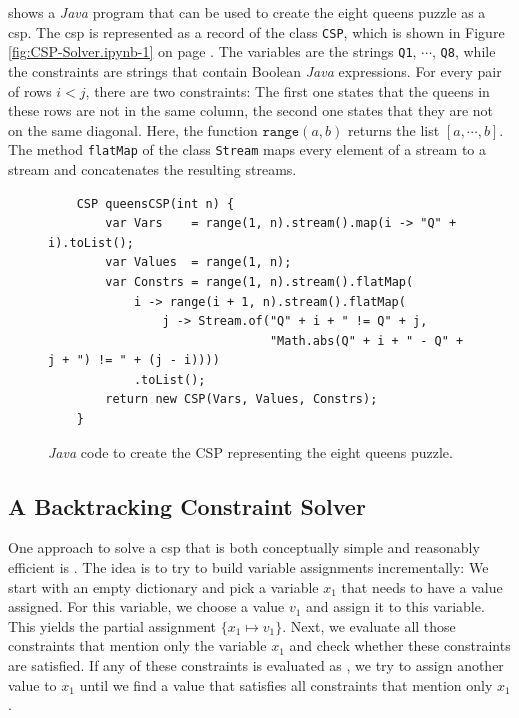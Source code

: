  shows a \textsl{Java} program that can be used to create the eight queens puzzle as a
\Gls{csp}.  The \Gls{csp} is represented as a record of the class \texttt{CSP}, which is shown in Figure
\ref{fig:CSP-Solver.ipynb-1} on page \pageref{fig:CSP-Solver.ipynb-1}.  The variables are the strings
\texttt{Q1}, $\cdots$, \texttt{Q8}, while the constraints are strings
that contain Boolean \textsl{Java} expressions.  For every pair of rows $i < j$, there are two constraints:  The
first one states that the queens in these rows are not in the same column, the second one states that they are not
on the same diagonal.  Here, the function $\texttt{range}(a, b)$ returns the list $[a, \cdots, b]$.  The method
\texttt{flatMap} of the class \texttt{Stream} maps every element of a stream to a stream and concatenates the
resulting streams.

\begin{figure}[!ht]
\centering
\begin{verbatim}
    CSP queensCSP(int n) {
        var Vars    = range(1, n).stream().map(i -> "Q" + i).toList();
        var Values  = range(1, n);
        var Constrs = range(1, n).stream().flatMap(
            i -> range(i + 1, n).stream().flatMap(
                j -> Stream.of("Q" + i + " != Q" + j,
                               "Math.abs(Q" + i + " - Q" + j + ") != " + (j - i))))
            .toList();
        return new CSP(Vars, Values, Constrs);
    }
\end{verbatim}
\vspace*{-0.3cm}
\caption{\textsl{Java} code to create the CSP representing the eight queens puzzle.}
\label{fig:queens-csp.stlx}
\end{figure}


\subsection{A Backtracking Constraint Solver}
One approach to solve a \Gls{csp} that is both conceptually simple and reasonably efficient is
.  The idea is to try to build variable assignments incrementally:  We start with
an empty dictionary and pick a variable $x_1$ that needs to have a value assigned.  For this variable, we
choose a value $v_1$ and assign it to this variable.  This yields the partial assignment $\{ x_1 \mapsto v_1 \}$.
Next, we evaluate all those constraints that mention only the variable $x_1$ and check whether these constraints
are satisfied.  If any of these constraints is evaluated as , we try to assign another value to
$x_1$ until we find a value that satisfies all constraints that mention only $x_1$.

